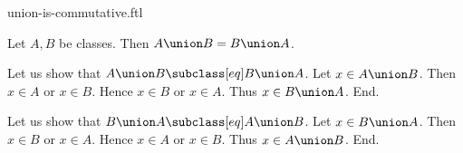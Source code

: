 \documentclass{article}
\begin{document}
\begin{smodule}[creators={Marcel Schütz}]{union-is-commutative.ftl}

  \begin{fproposition*}[label=5874937237602304]
    Let $A, B$ be classes.
    Then $A \union B = B \union A$.
  \end{fproposition*}
  \begin{fproof}
    Let us show that $A \union B \subclass[eq] B \union A$.
      Let $x \in A \union B$.
      Then $x \in A$ or $x \in B$.
      Hence $x \in B$ or $x \in A$.
      Thus $x \in B \union A$.
    End.

    Let us show that $B \union A \subclass[eq] A \union B$.
      Let $x \in B \union A$.
      Then $x \in B$ or $x \in A$.
      Hence $x \in A$ or $x \in B$.
      Thus $x \in A \union B$.
    End.
  \end{fproof}
\end{smodule}
\end{document}
